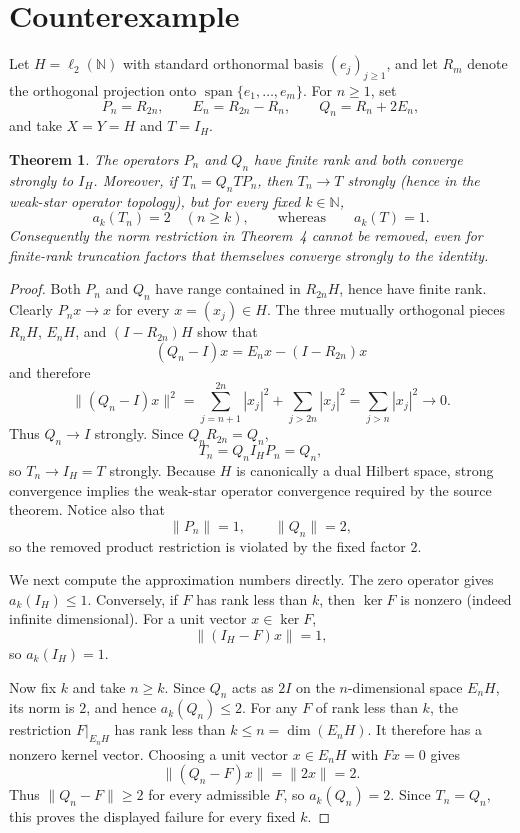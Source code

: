 \documentclass[11pt]{article}
\newtheorem{theorem}{Theorem}
\newcommand{\Hh}{\ell_2(\mathbb N)}
\begin{document}
\section{Counterexample}

Let $H=\Hh$ with standard orthonormal basis $(e_j)_{j\geq1}$, and let $R_m$
denote the orthogonal projection onto
$\operatorname{span}\{e_1,\ldots,e_m\}$. For $n\geq1$, set
\[
 P_n=R_{2n},\qquad E_n=R_{2n}-R_n,\qquad
 Q_n=R_n+2E_n,
\]
and take $X=Y=H$ and $T=I_H$.

\begin{theorem}\label{thm:main}
The operators $P_n$ and $Q_n$ have finite rank and both converge strongly to
$I_H$. Moreover, if $T_n=Q_nTP_n$, then $T_n\to T$ strongly (hence in the
weak-star operator topology), but for every fixed $k\in\mathbb N$,
\[
 a_k(T_n)=2\quad(n\geq k),
 \qquad\text{whereas}\qquad a_k(T)=1.
\]
Consequently the norm restriction in Theorem~4 cannot be removed, even for
finite-rank truncation factors that themselves converge strongly to the
identity.
\end{theorem}

\begin{proof}
Both $P_n$ and $Q_n$ have range contained in $R_{2n}H$, hence have finite
rank. Clearly $P_nx\to x$ for every $x=(x_j)\in H$. The three mutually
orthogonal pieces $R_nH$, $E_nH$, and $(I-R_{2n})H$ show that
\[
 (Q_n-I)x=E_nx-(I-R_{2n})x
\]
and therefore
\[
 \|(Q_n-I)x\|^2
 =\sum_{j=n+1}^{2n}|x_j|^2+\sum_{j>2n}|x_j|^2
 =\sum_{j>n}|x_j|^2\longrightarrow0.
\]
Thus $Q_n\to I$ strongly. Since $Q_nR_{2n}=Q_n$,
\[
 T_n=Q_n I_H P_n=Q_n,
\]
so $T_n\to I_H=T$ strongly. Because $H$ is canonically a dual Hilbert space,
strong convergence implies the weak-star operator convergence required by the
source theorem. Notice also that
\[
 \|P_n\|=1,\qquad \|Q_n\|=2,
\]
so the removed product restriction is violated by the fixed factor $2$.

We next compute the approximation numbers directly. The zero operator gives
$a_k(I_H)\leq1$. Conversely, if $F$ has rank less than $k$, then $\ker F$ is
nonzero (indeed infinite dimensional). For a unit vector $x\in\ker F$,
\[
 \|(I_H-F)x\|=1,
\]
so $a_k(I_H)=1$.

Now fix $k$ and take $n\geq k$. Since $Q_n$ acts as $2I$ on the
$n$-dimensional space $E_nH$, its norm is $2$, and hence $a_k(Q_n)\leq2$.
For any $F$ of rank less than $k$, the restriction
$F|_{E_nH}$ has rank less than $k\leq n=\dim(E_nH)$. It therefore has a
nonzero kernel vector. Choosing a unit vector $x\in E_nH$ with $Fx=0$ gives
\[
 \|(Q_n-F)x\|=\|2x\|=2.
\]
Thus $\|Q_n-F\|\geq2$ for every admissible $F$, so $a_k(Q_n)=2$. Since
$T_n=Q_n$, this proves the displayed failure for every fixed $k$.
\end{proof}
\end{document}
